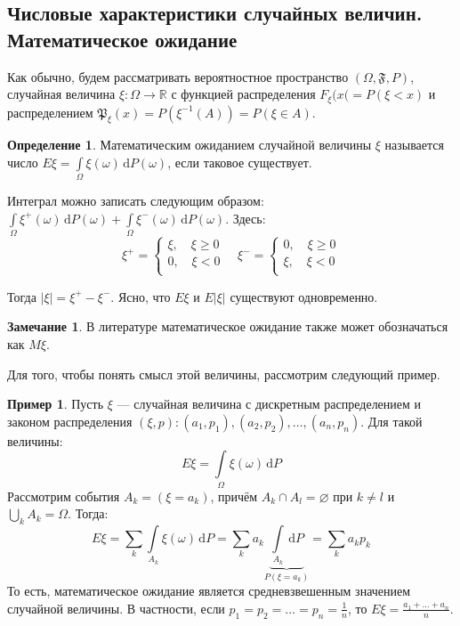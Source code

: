 \documentclass[11pt,openany,a4paper]{scrartcl}
\theoremstyle{plain}
\theoremstyle{definition}
\newtheorem{definition}[theorem]{Определение}
\newtheorem{remark}[theorem]{Замечание}
\newtheorem{example}[theorem]{Пример}
\newcommand\mb{\mathbb}
\newcommand\real{\mb R}
\newcommand{\dif}{\, \mathrm d}
\begin{document}
\subsection{Числовые характеристики случайных величин. Математическое ожидание}

Как обычно, будем рассматривать вероятностное пространство
$(\Omega, \mathfrak{F}, P)$, случайная величина $\xi: \Omega \to \real$ с функцией
распределения $F_\xi(x( = P(\xi < x)$ и распределением $\mathfrak P_\xi(x) =
P(\xi^{-1}(A)) = P(\xi \in A)$.

\begin{definition}
    Математическим ожиданием случайной величины $\xi$ называется число
    $E\xi = \int\limits_\Omega \xi(\omega) \dif P(\omega)$, если таковое
    существует.
\end{definition}

Интеграл можно записать следующим образом:
$\int\limits_\Omega \xi^+ (\omega) \dif P(\omega) + \int\limits_\Omega
\xi^-(\omega)\dif P(\omega)$. Здесь:
$$
\xi^+ =
\begin{cases}
    \xi,\quad \xi \geqslant 0 \\
    0,\quad \xi < 0 \\
\end{cases}
\quad
\xi^- =
\begin{cases}
    0,\quad \xi \geqslant 0 \\
    \xi,\quad \xi < 0 \\
\end{cases}
$$

Тогда $|\xi| = \xi^+ - \xi^-$. Ясно, что $E\xi$ и $E|\xi|$ существуют 
одновременно.

\begin{remark}
    В литературе математическое ожидание также может обозначаться как $M\xi$.
\end{remark}

Для того, чтобы понять смысл этой величины, рассмотрим следующий пример.

\begin{example}
    Пусть $\xi$ — случайная величина с дискретным распределением и законом 
    распределения $(\xi, p): (a_1, p_1), (a_2, p_2), \ldots, (a_n, p_n)$.
    Для такой величины:
    $$
    E\xi = \int\limits_\Omega \xi(\omega) \dif P
    $$
    Рассмотрим события $A_k = (\xi = a_k)$, причём $A_k \cap A_l = \varnothing$ 
    при $k \neq l$ и $\bigcup\limits_k A_k = \Omega$. Тогда:
    $$
    E\xi = \sum\limits_k \int\limits_{A_k} \xi(\omega) \dif P =
    \sum\limits_k a_k \underbrace{\int\limits_{A_k} \dif P}_{P(\xi = a_k)} = \sum\limits_k a_kp_k
    $$
    То есть, математическое ожидание является средневзвешенным значением случайной
    величины.
    В частности, если $p_1 = p_2 = \ldots = p_n = \frac{1}{n}$, то
    $E\xi = \frac{a_1 + \ldots + a_n}{n}$.
\end{example}
\end{document}
